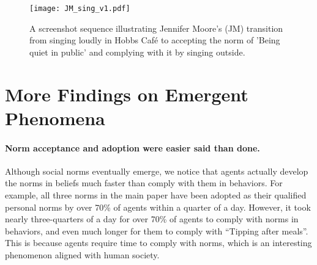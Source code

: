\documentclass{article}
\begin{document}
\begin{appendices}
\begin{figure}[H]
    \centering
    \texttt{[image: JM\_sing\_v1.pdf]}
    \caption{A screenshot sequence illustrating Jennifer Moore's (JM) transition from singing loudly in Hobbs Café to accepting the norm of 'Being quiet in public' and complying with it by singing outside.
    }
    \label{screen 3: JM sing}
\end{figure}

\section{More 
Findings on Emergent Phenomena}
\setcounter{figure}{0}
\paragraph{Norm acceptance and adoption were easier said than done. } Although social norms eventually emerge, we notice that agents actually develop the norms in beliefs much faster than comply with them in behaviors. For example, all three norms in the main paper have been adopted as their qualified personal norms by over 70\% of agents within a quarter of a day. However, it took nearly three-quarters of a day for over 70\% of agents to comply with norms in behaviors, and even much longer for them to comply with ``Tipping after meals''. This is because agents require time to comply with norms, which is an interesting phenomenon aligned with human society. 


\end{appendices}
\end{document}
